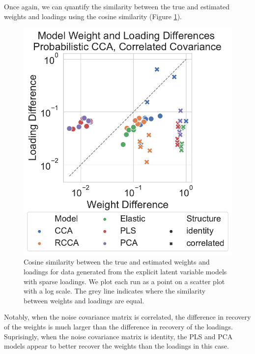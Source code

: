 Once again, we can quantify the similarity between the true and estimated weights and \gls{loadings} using the cosine similarity (Figure \ref{fig:explicit-weights-loadings-cosine}).

\begin{figure}
\centering
\includegraphics[width=0.8\linewidth]{figures/simulated/explicit/weight_loading_difference}
\caption{Cosine similarity between the true and estimated weights and \gls{loadings} for data generated from the explicit latent variable models with sparse \gls{loadings}. We plot each run as a point on a scatter plot with a log scale. The grey line indicates where the similarity between weights and loadings are equal.}\label{fig:explicit-weights-loadings-cosine}
\end{figure}

Notably, when the noise covariance matrix is correlated, the difference in recovery of the weights is much larger than the difference in recovery of the \gls{loadings}.
Suprisingly, when the noise covariance matrix is identity, the PLS and PCA models appear to better recover the weights than the loadings in this case.


